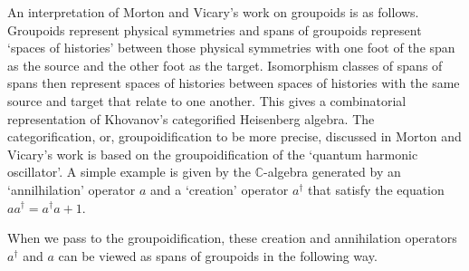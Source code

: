 \documentclass[11pt]{amsart}
\theoremstyle{remark}
\theoremstyle{definition}
\begin{document}
An interpretation of Morton and Vicary's \cite{MortVic} work on groupoids is as follows. Groupoids represent physical symmetries and spans of groupoids represent `spaces of histories' between those physical symmetries with one foot of the span as the source and the other foot as the target. Isomorphism classes of spans of spans then represent spaces of histories between spaces of histories with the same source and target that relate to one another. This gives a combinatorial representation of Khovanov's categorified Heisenberg algebra. The categorification, or, groupoidification to be more precise, discussed in Morton and Vicary's work is based on the groupoidification of the `quantum harmonic oscillator'. A simple example is given by the $\mathbb{C}$-algebra generated by an `annilhilation' operator $a$ and a `creation' operator $a^\dagger$ that satisfy the equation $aa^\dagger=a^\dagger a+1$.

When we pass to the groupoidification, these creation and annihilation operators $a^\dagger$ and $a$ can be viewed as spans of groupoids in the following way.
\end{document}
